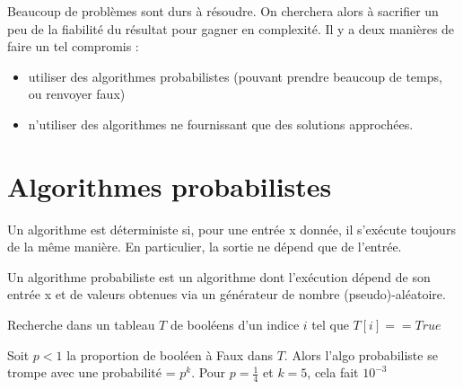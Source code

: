 
Beaucoup de problèmes sont durs à résoudre. On cherchera alors à sacrifier un peu de la fiabilité du résultat pour gagner en complexité. Il y a deux manières de faire un tel compromis : \begin{itemize}
	\item utiliser des algorithmes probabilistes (pouvant prendre beaucoup de temps, ou renvoyer faux)
	\item n'utiliser des algorithmes ne fournissant que des solutions approchées.
\end{itemize}

\section{Algorithmes probabilistes}

\begin{definition}
	Un algorithme est déterministe si, pour une entrée x donnée, il s’exécute toujours de la même manière. En particulier, la sortie ne dépend que de l'entrée.
	
	Un algorithme probabiliste est un algorithme dont l'exécution dépend de son entrée x et de valeurs obtenues via un générateur de nombre (pseudo)-aléatoire.
\end{definition}

\begin{example}
	\label{11-prem-ex}
	\normalfont
	Recherche dans un tableau $T$ de booléens d'un indice $i$ tel que $T[i] == True$\\
	\begin{minipage}{0.45\linewidth}
		\begin{algorithm}[H]
			\caption{$deterministe(T)$}
		\end{algorithm}
	\end{minipage} \qquad
	\begin{minipage}{0.45\linewidth}
		\begin{algorithm}[H]
			\caption{$probabiliste(T, k)$}
		\end{algorithm}
	\end{minipage}
\end{example}

\begin{rem}
	Soit $p<1$ la proportion de booléen à Faux dans $T$. Alors l'algo probabiliste se trompe avec une probabilité = $p^k$.	
	Pour $p = \frac{1}{4}$ et $k=5$, cela fait $10^{-3}$
\end{rem}

